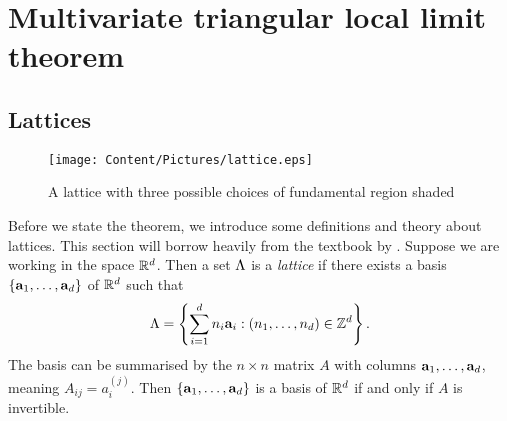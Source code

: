 \section{Multivariate triangular local limit theorem}
\label{chap:llt}


\subsection{Lattices}

\begin{figure}[htbp]
    \centering
    \texttt{[image: Content/Pictures/lattice.eps]}
    \caption{A lattice with three possible choices of fundamental region shaded}
    \label{fig:lattice}
\end{figure}

Before we state the theorem, we introduce some definitions and theory about lattices. This section will borrow heavily from the textbook by \citet{schrijverTheoryLinearInteger1998}. Suppose we are working in the space ${\mathbb R}^d$. Then a set $\Lambda$ is a \emph{lattice} if there exists a basis $\{{\mathbf a}_1, \ldots, {\mathbf a}_d\}$ of ${\mathbb R}^d$ such that
\begin{equation*}
    \Lambda = \left\{ \sum_{i=1}^d n_i {\mathbf a}_i : (n_1, \ldots, n_d) \in {\mathbb Z}^d \right\}.
\end{equation*}
The basis can be summarised by the $n \times n$ matrix $A$ with columns ${\mathbf a}_1, \ldots, {\mathbf a}_d$, meaning $A_{ij} = a_i^{(j)}$. Then $\{{\mathbf a}_1, \ldots, {\mathbf a}_d\}$ is a basis of ${\mathbb R}^d$ if and only if $A$ is invertible. 


